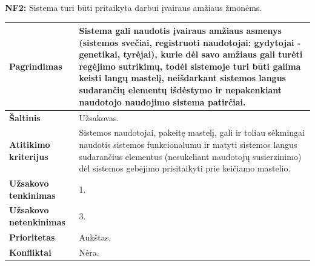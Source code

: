\documentclass[12pt]{article}
\begin{document}
\noindent \textbf{NF2:} Sistema turi būti pritaikyta darbui įvairaus amžiaus
žmonėms.
\label{sec:NF2}
\begin{table}[htb!]
    \captionsetup{justification=centering}
    \begin{tabular}{|m{4.9cm}|m{11cm}|}
        \hline
        \raggedleft \textbf{\cellcolor{deepchampagne}Pagrindimas} &
        Sistema gali naudotis įvairaus amžiaus asmenys (sistemos svečiai,
        registruoti naudotojai: gydytojai - genetikai, tyrėjai), kurie dėl savo
        amžiaus gali turėti regėjimo sutrikimų, todėl sistemoje turi būti galima
        keisti langų mastelį, neišdarkant sistemos langus sudarančių elementų
        išdėstymo ir nepakenkiant naudotojo naudojimo sistema patirčiai. \\
        \hline
        \raggedleft \textbf{\cellcolor{deepchampagne}Šaltinis} & Užsakovas. \\
        \hline
        \raggedleft \textbf{\cellcolor{deepchampagne}Atitikimo kriterijus} & 
        Sistemos naudotojai, pakeitę mastelį, gali ir toliau sėkmingai naudotis
        sistemos funkcionalumu ir matyti sistemos langus sudarančius elementus
        (nesukeliant naudotojų susierzinimo) dėl sistemos gebėjimo prisitaikyti
        prie keičiamo mastelio. \\
        \hline
        \raggedleft \textbf{\cellcolor{deepchampagne}Užsakovo tenkinimas} & 1. \\
        \hline
        \raggedleft \textbf{\cellcolor{deepchampagne}Užsakovo netenkinimas} & 3. \\
        \hline
        \raggedleft \textbf{\cellcolor{deepchampagne}Prioritetas} & Aukštas. \\
        \hline
        \raggedleft \textbf{\cellcolor{deepchampagne}Konfliktai} & Nėra. \\
        \hline
    \end{tabular}
\end{table}

\newpage
\end{document}
